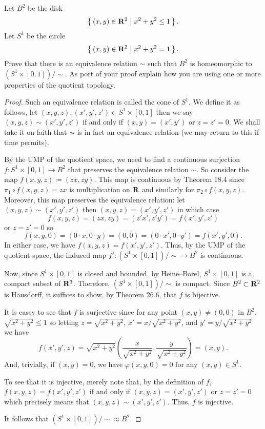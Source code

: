 \begin{problem}
Let $B^2$ be the disk
\[
\left\{\,(x,y)\in\mathbf{R}^2\;\middle|\;x^2+y^2\leq 1\,\right\}.
\]
Let $S^1$ be the circle
\[
\left\{\,(x,y)\in\mathbf{R}^2\;\middle|\;x^2+y^2=1\,\right\}.
\]
Prove that there is an equivalence relation $\sim$ such that $B^2$ is
homeomorphic to $(S^1\times[0,1])/{\sim}$. As port of your proof explain
how you are using one or more properties of the quotient topology.
\end{problem}
\begin{proof}
Such an equivalence relation is called the cone of $S^1$. We define it as
follows, let $(x,y,z),(x',y',z')\in S^1\times[0,1]$ then we say
$(x,y,z)\sim(x',y',z')$ if and only if $(x,y)=(x',y')$ or $z=z'=0$. We
shall take it on faith that $\sim$ is in fact an equivalence relation (we
may return to this if time permits).

By the UMP of the quotient space, we need to find a continuous surjection
$f\colon S^1\times[0,1]\to B^2$ that preserves the equivalence relation
$\sim$. So consider the map $f(x,y,z)\coloneqq(zx,zy)$. This map is
continuous by Theorem 18.4 since $\pi_1\circ f(x,y,z)=zx$ is multiplication
on $\mathbf{R}$ and similarly for $\pi_2\circ f(x,y,z)$. Moreover, this map
preserves the equivalence relation: let $(x,y,z)\sim(x',y',z')$ then
$(x,y,z)=(x',y',z')$ in which case
\[
f(x,y,z)=(zx,zy)=(z'x',z'y')=f(x',y',z')
\]
or $z=z'=0$ so
\[
f(x,y,0)=(0\cdot x,0\cdot y)=(0,0)=(0\cdot x',0\cdot y')=f(x',y',0).
\]
In either case, we have $f(x,y,z)=f(x',y',z')$. Thus, by the UMP of the
quotient space, the induced map $f'\colon (S^1\times[0,1])/{\sim}\to B^2$
is continuous.

Now, since $S^1\times[0,1]$ is closed and bounded, by Heine--Borel,
$S^1\times[0,1]$ is a compact subset of $\mathbf{R}^3$. Therefore,
$(S^1\times[0,1])/{\sim}$ is compact. Since $B^2\subset\mathbf{R}^2$ is
Hausdorff, it suffices to show, by Theorem 26.6, that $f$ is bijective.

It is eassy to see that $f$ is surjective since for any point
$(x,y)\neq(0,0)$ in $B^2$, $\sqrt{x^2+y^2}\leq 1$ so letting
$z=\sqrt{x^2+y^2}$, $x'=x/\sqrt{x^2+y^2}$, and $y'=y/\sqrt{x^2+y^2}$ we
have
\[
f(x',y',z)=\sqrt{x^2+y^2}
\left(\frac{x}{\sqrt{x^2+y^2}},
\frac{y}{\sqrt{x^2+y^2}}\right)=(x,y).
\]
And, trivially, if $(x,y)=0$, we have $\varphi(x,y,0)=0$ for any $(x,y)\in
S^1$.

To see that it is injective, merely note that, by the definition of $f$,
$f(x,y,z)=f(x',y',z')$ if and only if $(x,y,z)=(x',y',z')$ or $z=z'=0$
which precisely means that $(x,y,z)\sim(x',y',z')$. Thus, $f$ is
injective.

It follows that $(S^1\times[0,1])/{\sim}\approx B^2$.
\end{proof}

